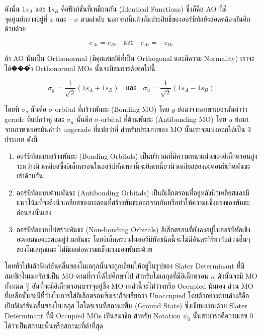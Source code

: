 \noindent ดังนั้น $1 s_A$ และ $1 s_B$ คือฟังก์ชันที่เหมือนกัน (Identical Functions) ซึ่งก็คือ AO ที่มีจุดศูนย์กลางอยู่ที่ $x$ และ
$-x$ ตามลำดับ นอกจากนี้แล้วสัมประสิทธิ์ของออร์บิทัลยังสอดคล้องกันอีกด้วยด้วย

\begin{equation}
  c_{A i} = c_{B i}
  \quad \text{และ} \quad
  c_{A i} = -c_{B i}
\end{equation}

ถ้า AO นั้นเป็น Orthonormal (มีคุณสมบัติที่เป็น Orthogonal และมีความ Normality) เราจะได้���่า Orthonormal MOs นั้นจะมีสมการดังต่อไปนี้

\begin{equation}
  \sigma_g
  =
  \frac{1}{\sqrt{2}}\left(1 s_A+1 s_B\right)
  \quad \text{และ} \quad
  \sigma_u
  =
  \frac{1}{\sqrt{2}}\left(1 s_A-1 s_B\right)
\end{equation}

\noindent โดยที่ $\sigma_g$ นั้นคือ $\sigma$-orbital ที่สร้างพันธะ (Bonding MO) โดย $g$ ย่อมาจากภาษาเยอรมันคำว่า gerade
ที่แปลว่าคู่ และ $\sigma_u$ นั้นคือ $\sigma$-orbital ที่ต้านพันธะ (Antibonding MO) โดย $u$ ย่อมาจากภาษาเยอรมันคำว่า ungerade
ที่แปลว่าคี่ สำหรับประเภทของ MO นั้นเราจะแบ่งออกได้เป็น 3 ประเภท ดังนี้

\begin{enumerate}[topsep=0pt,noitemsep]
  \setlength\itemsep{1em}
  \item ออร์บิทัลแบบสร้างพันธะ (Bonding Orbitals)
        เป็นบริเวณที่มีความหนาแน่นของอิเล็กตรอนสูงระหว่างนิวเคลียสซึ่งอิเล็กตรอนในออร์บิทัลเหล่านี้จะยึดเหนี่ยวนิวเคลียสของอะตอมที่เกิดพันธะเข้าด้วยกัน

  \item ออร์บิทัลแบบต้านพันธะ (Antibonding Orbitals)
        เป็นอิเล็กตรอนที่อยู่หลังนิวเคลียสและมีแนวโน้มที่จะดึงนิวเคลียสของอะตอมที่สร้างพันธะออกจากกันหรือทำให้ความแข็งแรงของพันธะอ่อนลงนั่นเอง

  \item ออร์บิทัลแบบไม่สร้างพันธะ (Non-bonding Orbitals)
        อิเล็กตรอนที่ยังคงอยู่ในออร์บิทัลเชิงอะตอมของอะตอมคู่ร่วมพันธะ โดยอิเล็กตรอนในออร์บิทัลชนิดนี้จะไม่มีอันตรกิริยากับส่วนอื่นๆของโมเลกุลและ%
        ไม่มีผลต่อความแข็งแรงของพันธะด้วย
\end{enumerate}

โดยทั่วไปแล้วฟังก์ชันคลื่นของโมเลกุลนั้นจะถูกเขียนให้อยู่ในรูปของ Slater Determinant ที่มีสมาชิกในเมทริกซ์เป็น MO ตามที่เราได้ไปศึกษาไป
สำหรับโมเลกุลที่มีอิเล็กตรอน $n$ ตัวนั้นจะมี MO ทั้งหมด $\frac{n}{2}$ อันที่จะมีอิเล็กตรอนบรรจุอยู่ซึ่ง MO เหล่านี้จะไม่ว่างหรือ Occupied
นั่นเอง ส่วน MO ที่เหลือนั้นจะมีที่ว่างในการใส่อิเล็กตรอนซึ่งเราก็จะเรียกว่า Unoccupied โดยตัวอย่างด้านล่างก็คือเป็นฟังก์ชันคลื่นของโมเลกุล%
ไฮโดรเจนที่สถานะพื้น (Ground State) ซึ่งเขียนแทนด้วย Slater Determinant ที่มี Occupied MOs เป็นสมาชิก สำหรับ Notation
$\psi_0$ นั้นสามารถตีความเลข 0 ได้ว่าเป็นสถานะพื้นหรือสถานะที่ต่ำที่สุด

